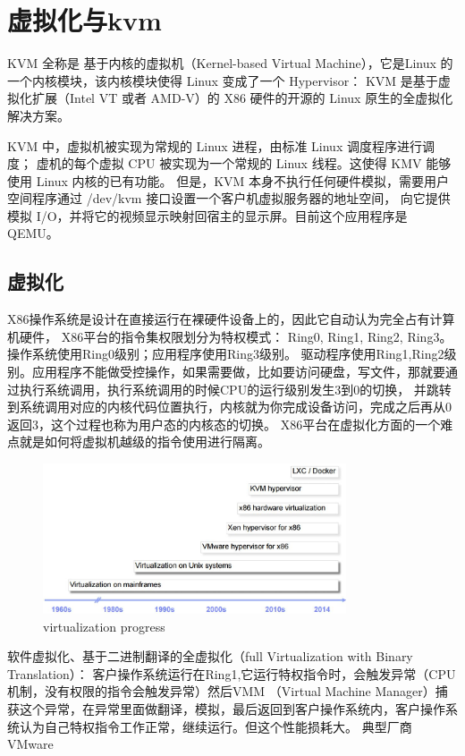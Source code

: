 \chapter{虚拟化与kvm}
KVM 全称是 基于内核的虚拟机（Kernel-based Virtual Machine），它是Linux 的一个内核模块，该内核模块使得 Linux 变成了一个 Hypervisor：
KVM 是基于虚拟化扩展（Intel VT 或者 AMD-V）的 X86 硬件的开源的 Linux 原生的全虚拟化解决方案。

KVM 中，虚拟机被实现为常规的 Linux 进程，由标准 Linux 调度程序进行调度；
虚机的每个虚拟 CPU 被实现为一个常规的 Linux 线程。这使得 KMV 能够使用 Linux 内核的已有功能。
  但是，KVM 本身不执行任何硬件模拟，需要用户空间程序通过 /dev/kvm 接口设置一个客户机虚拟服务器的地址空间，
  向它提供模拟 I/O，并将它的视频显示映射回宿主的显示屏。目前这个应用程序是 QEMU。
  
\section{虚拟化}
X86操作系统是设计在直接运行在裸硬件设备上的，因此它自动认为完全占有计算机硬件，
X86平台的指令集权限划分为特权模式： Ring0, Ring1, Ring2, Ring3。 操作系统使用Ring0级别；应用程序使用Ring3级别。
驱动程序使用Ring1,Ring2级别。应用程序不能做受控操作，如果需要做，比如要访问硬盘，写文件，那就要通过执行系统调用，执行系统调用的时候CPU的运行级别发生3到0的切换，
并跳转到系统调用对应的内核代码位置执行，内核就为你完成设备访问，完成之后再从0返回3，这个过程也称为用户态的内核态的切换。
X86平台在虚拟化方面的一个难点就是如何将虚拟机越级的指令使用进行隔离。

\begin{figure}[!ht]
    \centering
     \caption{\label{Fig:virtualization-progress} virtualization progress}
    \includegraphics[width=0.8\textwidth]{kvm/virtualization-progress.jpg}
\end{figure}



软件虚拟化、基于二进制翻译的全虚拟化（full Virtualization with Binary Translation）：
客户操作系统运行在Ring1,它运行特权指令时，会触发异常（CPU机制，没有权限的指令会触发异常）然后VMM （Virtual Machine Manager）捕获这个异常，在异常里面做翻译，模拟，最后返回到客户操作系统内，客户操作系统认为自己特权指令工作正常，继续运行。但这个性能损耗大。 典型厂商 VMware

